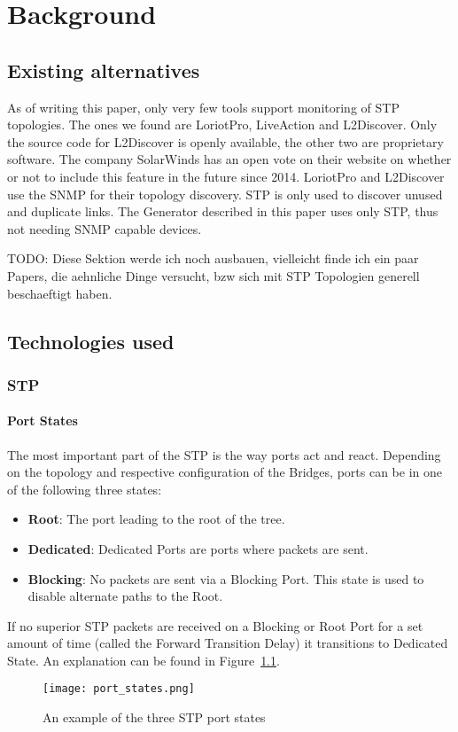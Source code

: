 \chapter{Background}
\section{Existing alternatives}
As of writing this paper, only very few tools support monitoring of STP topologies.
The ones we found are LoriotPro\cite{LoriotPro}, LiveAction\cite{LiveAction} and L2Discover\cite{L2Discover}.
Only the source code for L2Discover is openly available, the other two are proprietary software.
The company SolarWinds has an open vote on their website on whether or not to include this feature in the future since 2014\cite{thwackSW}.
LoriotPro and L2Discover use the SNMP for their topology discovery.
STP is only used to discover unused and duplicate links.
The Generator described in this paper uses only STP, thus not needing SNMP capable devices.

TODO: Diese Sektion werde ich noch ausbauen, vielleicht finde ich ein paar Papers, die aehnliche Dinge versucht, bzw sich mit STP Topologien generell beschaeftigt haben.

\section{Technologies used}
\subsection{STP}
\subsubsection{Port States}
The most important part of the STP is the way ports act and react.
Depending on the topology and respective configuration of the Bridges, ports can be in one of the following three states:
\begin{itemize}
    \item \textbf{Root}: The port leading to the root of the tree.
    \item \textbf{Dedicated}: Dedicated Ports are ports where packets are sent.
    \item \textbf{Blocking}: No packets are sent via a Blocking Port.
        This state is used to disable alternate paths to the Root.
\end{itemize}
If no superior STP packets are received on a Blocking or Root Port for a set amount of time (called the Forward Transition Delay) it transitions to Dedicated State.
An explanation can be found in Figure~\ref{fig:port_states}.
\begin{figure}
    \centering
    \texttt{[image: port\_states.png]}
    \caption{An example of the three STP port states}
    \label{fig:port_states}
\end{figure}
